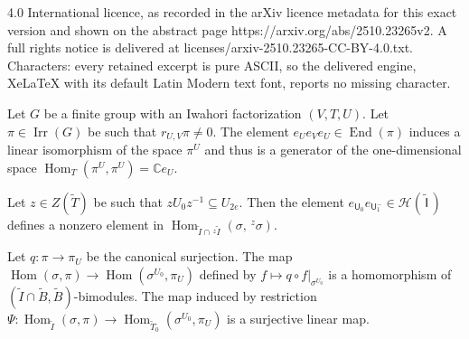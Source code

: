\documentclass[10pt,a4paper]{amsart}
\newcommand{\End}{\operatorname{End}}
\newcommand{\Hcal}{\mathcal{H}}
\newcommand{\Hom}{\operatorname{Hom}}
\newcommand{\Ift}{\widetilde{\mathsf{I}}}
\newcommand{\Irr}{\operatorname{Irr}}
\newcommand{\It}{\widetilde{I}}
\newcommand{\Tt}{\widetilde{T}}
\newcommand{\Uf}{\mathsf{U}}
\begin{document}
4.0 International licence, as recorded in the arXiv licence metadata for this exact version and shown on the abstract page https://arxiv.org/abs/2510.23265v2. A full rights notice is delivered at licenses/arxiv-2510.23265-CC-BY-4.0.txt. Characters: every retained excerpt is pure ASCII, so the delivered engine, XeLaTeX with its default Latin Modern text font, reports no missing character.
\begin{Lem}\label{L3to1}
	Let $G$ be a finite group with an Iwahori factorization $(V,T,U)$. Let $\pi\in \Irr(G)$ be such that $r_{U,V}\pi\neq 0$. The element $e_{U}e_{V}e_{U}\in \End({\pi})$ induces a linear isomorphism of the space $\pi^{U}$ and thus is a generator of the one-dimensional space $\Hom_{T}(\pi^{U},\pi^{U})=\mathbb{C}e_{U}$.
\end{Lem}

\begin{Lem}\label{VeryPosSupp}
	Let $z\in Z(\Tt)$ be such that $zU_{0}z^{-1}\subseteq U_{2e}$. Then the element $e_{\Uf_{0}}e_{\Uf^{-}_{1}}\in\Hcal(\,\Ift\,)$ defines a nonzero element in $\Hom_{\It\cap\,^{z}\It}(\sigma,\,^{z}\sigma)$.
\end{Lem}

\begin{Lem}\label{LemSurj}
Let $q:\pi\to\pi_U$ be the canonical surjection. The map $\Hom(\sigma,\pi)\rightarrow \Hom(\sigma^{U_{0}},\pi_{U})$ defined by $f\mapsto q\circ f|_{\sigma^{U_{0}}}$ is a homomorphism of $(\It\cap \widetilde{B},\widetilde{B})$-bimodules. The map induced by restriction $\Psi:\Hom_{\It}(\sigma,\pi)\rightarrow \Hom_{\Tt_{0}}(\sigma^{U_{0}},\pi_{U})$ is a surjective linear map.
\end{Lem}
\end{document}

